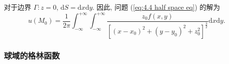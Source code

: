对于边界 $\Gamma:z=0$, $\mathrm{d}S=\mathrm{d}x\mathrm{d}y$. 因此, 问题 (\ref{eq:4.4 half space eq}) 的解为
\begin{equation}
    u(M_0)=\frac{1}{2\pi}\int_{-\infty}^{+\infty}\int_{-\infty}^{+\infty}\frac{z_0f(x,y)}{[(x-x_0)^2+(y-y_0)^2+z_0^2]^\frac{3}{2}}\mathrm{d}x\mathrm{d}y.
\end{equation}

\subsubsection{球域的格林函数}
